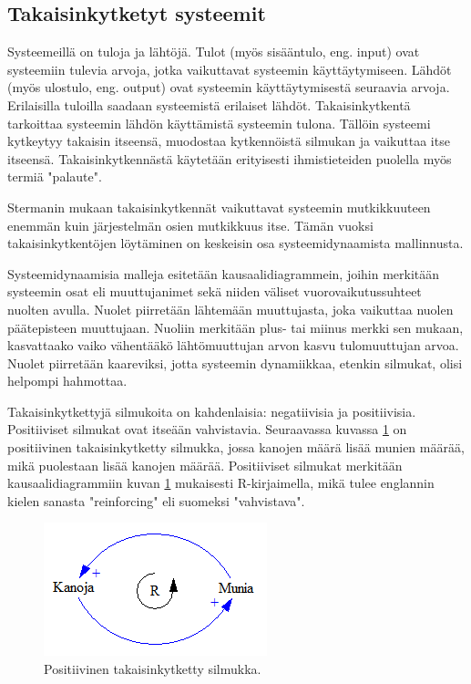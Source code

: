 \documentclass[finnish,12pt,a4paper,pdftex]{article}
\begin{document}
\begin{onehalfspacing}
\subsection{Takaisinkytketyt systeemit \label{sysdyn:takaisinkytkenta}}

Systeemeillä on tuloja ja lähtöjä. Tulot (myös sisääntulo, eng. input) ovat systeemiin tulevia arvoja, jotka vaikuttavat systeemin käyttäytymiseen. Lähdöt (myös ulostulo, eng. output) ovat systeemin käyttäytymisestä seuraavia arvoja. Erilaisilla tuloilla saadaan systeemistä erilaiset lähdöt. Takaisinkytkentä tarkoittaa systeemin lähdön käyttämistä systeemin tulona. Tällöin systeemi kytkeytyy takaisin itseensä, muodostaa kytkennöistä silmukan ja vaikuttaa itse itseensä. Takaisinkytkennästä käytetään erityisesti ihmistieteiden puolella myös termiä "palaute". \cite{Sterman2000} %

Stermanin \cite[s. 12]{Sterman2000} mukaan takaisinkytkennät vaikuttavat systeemin mutkikkuuteen enemmän kuin järjestelmän osien mutkikkuus itse. Tämän vuoksi takaisinkytkentöjen löytäminen on keskeisin osa systeemidynaamista mallinnusta. 

Systeemidynaamisia malleja esitetään kausaalidiagrammein, joihin merkitään systeemin osat eli muuttujanimet sekä niiden väliset vuorovaikutussuhteet nuolten avulla. Nuolet piirretään lähtemään muuttujasta, joka vaikuttaa nuolen päätepisteen muuttujaan. Nuoliin merkitään plus- tai miinus merkki sen mukaan, kasvattaako vaiko vähentääkö lähtömuuttujan arvon kasvu tulomuuttujan arvoa. Nuolet piirretään kaareviksi, jotta systeemin dynamiikkaa, etenkin silmukat, olisi helpompi hahmottaa. \cite{Sterman2000}

Takaisinkytkettyjä silmukoita on kahdenlaisia: negatiivisia ja positiivisia. Positiiviset silmukat ovat itseään vahvistavia. Seuraavassa kuvassa \ref{sysdyn:positiivinen} on positiivinen takaisinkytketty silmukka, jossa kanojen määrä lisää munien määrää, mikä puolestaan lisää kanojen määrää. Positiiviset silmukat merkitään kausaalidiagrammiin kuvan \ref{sysdyn:positiivinen} mukaisesti R-kirjaimella, mikä tulee englannin kielen sanasta "reinforcing" eli suomeksi "vahvistava". \cite[s. 12--13]{Sterman2000}

\begin{figure}[H]
\centering \includegraphics{positiivinen}
\caption{Positiivinen takaisinkytketty silmukka. \cite[s. 13]{Sterman2000} \label{sysdyn:positiivinen}}
\end{figure}


\end{onehalfspacing}
\end{document}
